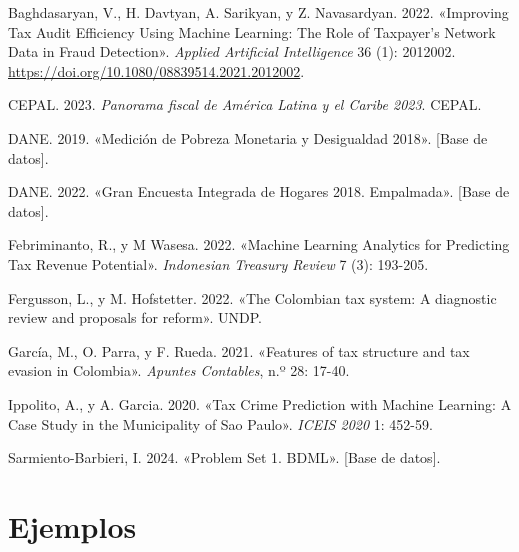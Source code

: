 \documentclass[
  11pt,
  letterpaper,
]{article}
\newlength{\cslhangindent}
\newlength{\cslentryspacingunit} %
\newenvironment{CSLReferences}[2] %
 {%
  \setlength{\parindent}{0pt}
  \ifodd #1
  \let\oldpar\par
  \def\par{\hangindent=\cslhangindent\oldpar}
  \fi
  \setlength{\parskip}{#2\cslentryspacingunit}
 }%
 {}
\begin{document}
\hypertarget{refs}{}
\begin{CSLReferences}{1}{0}
\leavevmode{}%
Baghdasaryan, V., H. Davtyan, A. Sarikyan, y Z. Navasardyan. 2022.
{«Improving Tax Audit Efficiency Using Machine Learning: The Role of
Taxpayer's Network Data in Fraud Detection»}. \emph{Applied Artificial
Intelligence} 36 (1): 2012002.
\url{https://doi.org/10.1080/08839514.2021.2012002}.

\leavevmode{}%
CEPAL. 2023. \emph{Panorama fiscal de América Latina y el Caribe 2023}.
CEPAL.

\leavevmode{}%
DANE. 2019. {«Medición de Pobreza Monetaria y Desigualdad 2018»}.
{[}Base de
datos{]}.

\leavevmode{}%
DANE. 2022. {«Gran Encuesta Integrada de Hogares 2018. Empalmada»}.
{[}Base de
datos{]}.

\leavevmode{}%
Febriminanto, R., y M Wasesa. 2022. {«Machine Learning Analytics for
Predicting Tax Revenue Potential»}. \emph{Indonesian Treasury Review} 7
(3): 193-205.

\leavevmode{}%
Fergusson, L., y M. Hofstetter. 2022. {«The Colombian tax system: A
diagnostic review and proposals for reform»}. UNDP.

\leavevmode{}%
García, M., O. Parra, y F. Rueda. 2021. {«Features of tax structure and
tax evasion in Colombia»}. \emph{Apuntes Contables}, n.º 28: 17-40.

\leavevmode{}%
Ippolito, A., y A. Garcia. 2020. {«Tax Crime Prediction with Machine
Learning: A Case Study in the Municipality of Sao Paulo»}. \emph{ICEIS
2020} 1: 452-59.

\leavevmode{}%
Sarmiento-Barbieri, I. 2024. {«Problem Set 1. BDML»}. {[}Base de
datos{]}.

\end{CSLReferences}

\hypertarget{ejemplos}{%
\section{Ejemplos}\label{ejemplos}}
\end{document}
